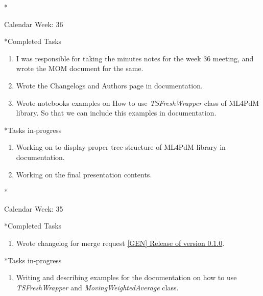 \documentclass[11pt,a4paper]{article}
\begin{document}
\newpage
\begin{section}*{Calendar Week: 36 \hfill \date{10 September, 2021}}
 \begin{subsection}*{Completed Tasks}
     \begin{enumerate}
         \item I was responsible for taking the minutes notes for the week 36 meeting, and wrote the MOM document for the same.
         \item Wrote the Changelogs and Authors page in documentation.
         \item Wrote notebooks examples on How to use \textit{TSFreshWrapper} class of ML4PdM library. So that we can include this examples in documentation.
     \end{enumerate}
 \end{subsection}
 \begin{subsection}*{Tasks in-progress}
     \begin{enumerate}
         \item Working on to display proper tree structure of ML4PdM library in documentation.
         \item Working on the final presentation contents.
     \end{enumerate}
 \end{subsection}
\end{section}

\newpage
\begin{section}*{Calendar Week: 35 \hfill \date{03 September, 2021}}
 \begin{subsection}*{Completed Tasks}
     \begin{enumerate}
         \item Wrote changelog for merge request \href{https://git.cs.uni-paderborn.de/machine-learning-for-predictive-maintenance/code/-/merge_requests/37}{[GEN] Release of version 0.1.0}.
     \end{enumerate}
 \end{subsection}
 \begin{subsection}*{Tasks in-progress}
     \begin{enumerate}
         \item Writing and describing examples for the documentation on how to use \textit{TSFreshWrapper} and \textit{MovingWeightedAverage} class.
     \end{enumerate}
 \end{subsection}
\end{section}
\end{document}
